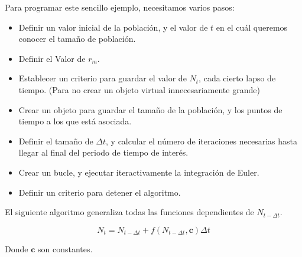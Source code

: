 \documentclass[12pt,letterpaper,]{book}
\begin{document}
Para programar este sencillo ejemplo, necesitamos varios pasos:

\begin{itemize}
\item
  Definir un valor inicial de la población, y el valor de \(t\) en el
  cuál queremos conocer el tamaño de población.
\item
  Definir el Valor de \(r_m\).
\item
  Establecer un criterio para guardar el valor de \(N_t\), cada cierto
  lapso de tiempo. (Para no crear un objeto virtual innecesariamente
  grande)
\item
  Crear un objeto para guardar el tamaño de la población, y los puntos
  de tiempo a los que está asociada.
\item
  Definir el tamaño de \(\Delta t\), y calcular el número de iteraciones
  necesarias hasta llegar al final del periodo de tiempo de interés.
\item
  Crear un bucle, y ejecutar iteractivamente la integración de Euler.
\item
  Definir un criterio para detener el algoritmo.
\end{itemize}

El siguiente algoritmo generaliza todas las funciones dependientes de
\(N_{t-\Delta t}\).

\[
N_t= N_{t-\Delta t} + f \left( N_{t-\Delta t},\mathbf{c} \right) \Delta t
\]

Donde \(\mathbf{c}\) son constantes.
\end{document}
